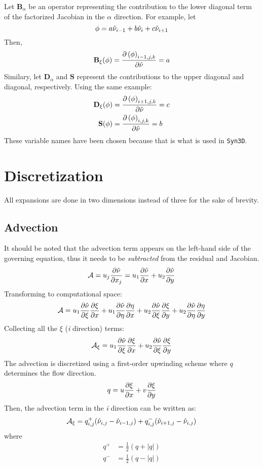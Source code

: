 \documentclass{SelimArticle}
\begin{document}
Let $\mathbf{B}_\alpha$ be an operator representing the contribution to the lower diagonal term
of the factorized Jacobian in the $\alpha$ direction. For example, let
$$
\phi = a\hat{\nu}_{i-1} + b\hat{\nu}_{i} + c\hat{\nu}_{i+1}
$$
Then,
$$
\mathbf{B}_\xi(\phi) =  \frac{\partial \left(\phi\right)_{i-1,j,k}}{\partial \hat{\nu}}  = a
$$
Similary, let $\mathbf{D}_\alpha$ and $\mathbf{S}$ represent the contributions to the
upper diagonal and diagonal, respectively. Using the same example:
\begin{align}
    \mathbf{D}_\xi(\phi) &=  \frac{\partial \left(\phi\right)_{i+1,j,k}}{\partial \hat{\nu}}  = c\\
    \mathbf{S}(\phi) &=  \frac{\partial \left(\phi\right)_{i,j,k}}{\partial \hat{\nu}}  = b
\end{align}
These variable names have been chosen because that is what is used in \texttt{Syn3D}.

\section{Discretization}
All expansions are done in two dimensions instead of three for the sake of brevity.


\subsection{Advection}
It should be noted that the advection term appears on the left-hand side of the governing equation,
thus it needs to be \textit{subtracted} from the residual and Jacobian.
\begin{equation}
    \mathcal{A} = u_j \frac{\partial \hat{\nu}}{\partial x_j}  = u_1 \frac{\partial \hat{\nu}}{\partial x}  + u_2 \frac{\partial \hat{\nu}}{\partial y} 
\end{equation}
Transforming to computational space:
\begin{equation}
    \mathcal{A} = u_1 \frac{\partial \hat{\nu}}{\partial \xi}  \frac{\partial \xi}{\partial x}  + u_1 \frac{\partial \hat{\nu}}{\partial \eta}  \frac{\partial \eta}{\partial x} 
        + u_2 \frac{\partial \hat{\nu}}{\partial \xi}  \frac{\partial \xi}{\partial y}  + u_2 \frac{\partial \hat{\nu}}{\partial \eta}  \frac{\partial \eta}{\partial y} 
\end{equation}
Collecting all the $\xi$ (\textit{i} direction) terms:
\begin{equation}
    \mathcal{A}_\xi = u_1 \frac{\partial \hat{\nu}}{\partial \xi}  \frac{\partial \xi}{\partial x}  + u_2 \frac{\partial \hat{\nu}}{\partial \xi}  \frac{\partial \xi}{\partial y} 
\end{equation}
The advection is discretized using a first-order upwinding scheme
where $q$ determines the flow direction.
$$
q = u \frac{\partial \xi}{\partial x}  + v \frac{\partial \xi}{\partial y} 
$$
Then, the advection term in the \textit{i} direction can be written as:
$$
\mathcal{A}_\xi = q^+_{i,j} (\hat{\nu}_{i,j} - \hat{\nu}_{i-1,j}) + q^-_{i,j}(\hat{\nu}_{i+1,j} - \hat{\nu}_{i,j})
$$
where
\begin{align}
    q^+ &= \frac{1}{2}\left( q + |q| \right)\\
    q^- &= \frac{1}{2}\left( q - |q| \right)
\end{align}
\end{document}
